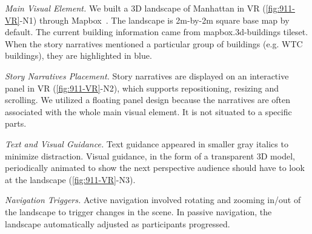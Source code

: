 \textit{Main Visual Element.} We built a 3D landscape of Manhattan in VR (\autoref{fig:911-VR}-N1) through Mapbox~\cite{mapbox_2017_mapbox}. The landscape is 2m-by-2m square base map by default. The current building information came from mapbox.3d-buildings tileset. When the story narratives mentioned a particular group of buildings (e.g. WTC buildings), they are highlighted in blue.

\textit{Story Narratives Placement.} Story narratives are displayed on an interactive panel in VR (\autoref{fig:911-VR}-N2), which supports repositioning, resizing and scrolling. We utilized a floating panel design because the narratives are often associated with the whole main visual element. It is not situated to a specific parts.

\textit{Text and Visual Guidance.} Text guidance appeared in smaller gray italics to minimize distraction. Visual guidance, in the form of a transparent 3D model, periodically animated to show the next perspective audience should have to look at the landscape (\autoref{fig:911-VR}-N3).

\textit{Navigation Triggers.} Active navigation involved rotating and zooming in/out of the landscape to trigger changes in the scene. In passive navigation, the landscape automatically adjusted as participants progressed.

